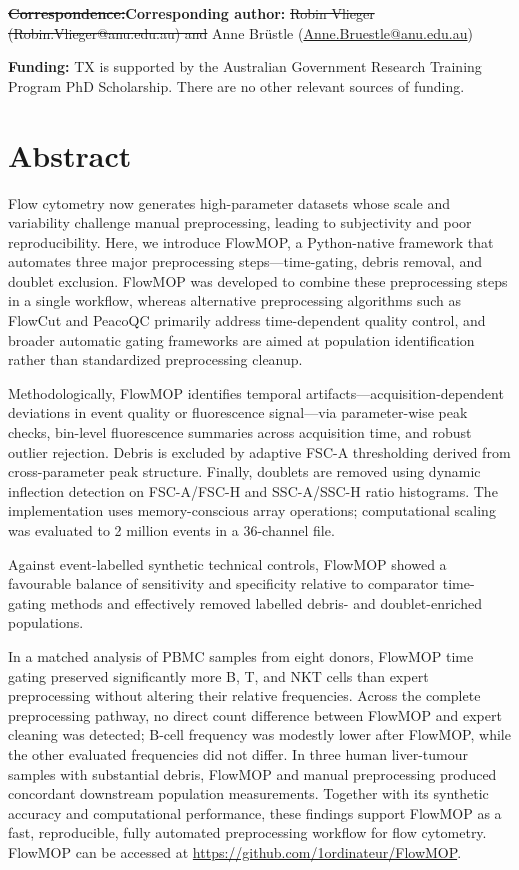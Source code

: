 \documentclass[ASNA]{latex/wiley/USG}
\begin{document}
\noindent\textcolor{revisionred}{\sout{\textbf{Correspondence:}}}\textcolor{revisionblue}{\textbf{Corresponding author:}} \textcolor{revisionred}{\sout{Robin Vlieger (Robin.Vlieger@anu.edu.au) and}} Anne Brüstle (\href{mailto:Anne.Bruestle@anu.edu.au}{Anne.Bruestle@anu.edu.au})

\par\noindent\textbf{Funding:} TX is supported by the Australian
Government Research Training Program PhD Scholarship. There are no other
relevant sources of funding.

\section*{Abstract}
Flow cytometry now generates high-parameter datasets whose scale and
variability challenge manual preprocessing, leading to subjectivity and
poor reproducibility. Here, we introduce FlowMOP, a Python-native
framework that automates three major preprocessing steps---time-gating,
debris removal, and doublet exclusion. FlowMOP was developed to combine
these preprocessing steps in a single workflow, whereas alternative
preprocessing algorithms such as FlowCut and PeacoQC primarily address
time-dependent quality control, and broader automatic gating frameworks
are aimed at population identification rather than standardized
preprocessing cleanup.

Methodologically, FlowMOP identifies temporal
artifacts---acquisition-dependent deviations in event quality or
fluorescence signal---via parameter-wise peak checks, bin-level
fluorescence summaries across acquisition time, and robust outlier
rejection. Debris is excluded by adaptive FSC-A thresholding derived
from cross-parameter peak structure. Finally, doublets are removed using
dynamic inflection detection on FSC-A/FSC-H and SSC-A/SSC-H ratio
histograms. The implementation uses memory-conscious array operations;
computational scaling was evaluated to 2 million events in a 36-channel
file.

Against event-labelled synthetic technical controls, FlowMOP showed a
favourable balance of sensitivity and specificity relative to comparator
time-gating methods and effectively removed labelled debris- and
doublet-enriched populations.

In a matched analysis of PBMC samples from eight donors, FlowMOP time
gating preserved significantly more B, T, and NKT cells than expert
preprocessing without altering their relative frequencies. Across the
complete preprocessing pathway, no direct count difference between
FlowMOP and expert cleaning was detected; B-cell frequency was modestly
lower after FlowMOP, while the other evaluated frequencies did not
differ. In three human liver-tumour samples with substantial debris,
FlowMOP and manual preprocessing produced concordant downstream
population measurements. Together with its synthetic accuracy and
computational performance, these findings support FlowMOP as a fast,
reproducible, fully automated preprocessing workflow for flow cytometry.
FlowMOP can be accessed at \url{https://github.com/1ordinateur/FlowMOP}.
\end{document}
